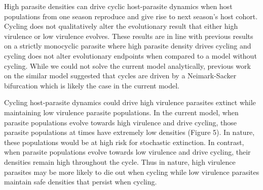 \documentclass{article}
\begin{document}
High parasite densities can drive cyclic host-parasite dynamics when host populations from one season reproduce and give rise to next season's host cohort. Cycling does not qualitatively alter the evolutionary result that either high virulence or low virulence evolves. These results are in line with previous results on a strictly monocyclic parasite\cite{} where high parasite density drives cycling and cycling does not alter evolutionary endpoints when compared to a model without cycling\cite{}. While we could not solve the current model analytically, previous work on the similar model suggested that cycles are driven by a Neimark-Sacker bifurcation which is likely the case in the current model. 

Cycling host-parasite dynamics could drive high virulence parasites extinct while maintaining low virulence parasite populations.
In the current model, when parasite populations evolve towards high virulence and drive cycling, those parasite populations at times have extremely low densities (Figure 5). In nature, these populations would be at high risk for stochastic extinction. In contrast, when parasite populations evolve towards low virulence and drive cycling, their densities remain high throughout the cycle. Thus in nature, high virulence parasites may be more likely to die out when cycling while low virulence parasites maintain safe densities that persist when cycling. 

\end{document}
